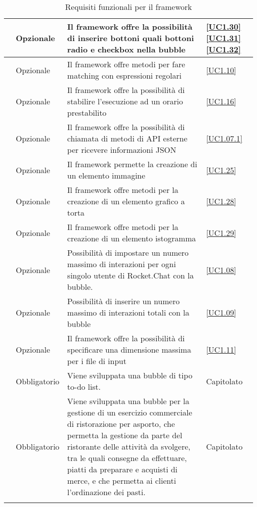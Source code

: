 \begin{longtable}{|P{1.5cm}|P{2.5cm}|P{6.5cm}|P{2.5cm}|}
	\hline \RequisitoOpF\label{L41} & Opzionale & Il framework offre la possibilità di inserire bottoni quali bottoni radio e checkbox nella bubble & \ref{UC1.30} \linebreak \ref{UC1.31} \linebreak \ref{UC1.32} \\
	\hline \RequisitoOpF\label{L42} & Opzionale & Il framework offre metodi per fare matching con espressioni regolari
	 & \ref{UC1.10} \\
	\hline \RequisitoOpF\label{L43} & Opzionale & Il framework offre la possibilità di stabilire l'esecuzione ad un orario prestabilito & \ref{UC1.16} \\
	\hline \RequisitoOpF\label{L44} & Opzionale & Il framework offre la possibilità di chiamata di metodi di API esterne per ricevere informazioni JSON & \ref{UC1.07.1} \\
	\hline \RequisitoOpF\label{L45} & Opzionale & Il framework permette la creazione di un elemento immagine & \ref{UC1.25} \\
	\hline \RequisitoOpF\label{L46} & Opzionale & Il framework offre metodi per la creazione di un elemento grafico a torta  & \ref{UC1.28} \\
	\hline \RequisitoOpF\label{L64} & Opzionale & Il framework offre metodi per la creazione di un elemento istogramma &\ref{UC1.29} \\	 
	 \hline \RequisitoOpF\label{L47} & Opzionale & Possibilità di impostare un numero massimo di interazioni per ogni singolo utente di Rocket.Chat con la bubble. & \ref{UC1.08} \\
	 \hline \RequisitoOpF\label{L48} & Opzionale & Possibilità di inserire un numero massimo di interazioni totali con la bubble & \ref{UC1.09} \\
	 \hline \RequisitoOpF\label{L49} & Opzionale & Il framework offre la possibilità di specificare una dimensione massima per i file di input & \ref{UC1.11} \\
	 \hline \RequisitoOpF\label{L3} & Obbligatorio & Viene sviluppata una bubble di tipo to-do list. & Capitolato \\
	 \hline \RequisitoOpF\label{L4} & Obbligatorio & Viene sviluppata una bubble per la gestione di un esercizio commerciale di ristorazione per asporto, che permetta la gestione da parte del ristorante delle attività da svolgere, tra le quali consegne da effettuare, piatti da preparare e acquisti di merce, e che permetta ai clienti l'ordinazione dei pasti. & Capitolato \\
	\hline
	\caption{Requisiti funzionali per il framework}
\end{longtable}

